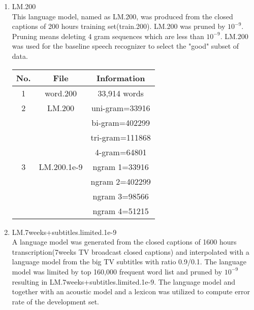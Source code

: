 \begin{enumerate}
\item LM.200 \\
This language model, named as LM.200, was produced from the closed captions of 200 hours training set(train.200). LM.200 was pruned by $10^{-9}$. Pruning means deleting 4 gram sequences which are less than $10^{-9}$.  LM.200 was used for the baseline speech recognizer to select the "good" subset of data.

\begin{center}
\begin{tabular}{ | c | c | c | }
\hline
\textbf{No.} & \textbf{File}  & \textbf{Information} \\ \hline \hline
1 & word.200 & 33,914 words \\  \hline
2 & LM.200 & uni-gram=33916 \\ 
 & & bi-gram=402299 \\ 
& & tri-gram=111868 \\  
& & 4-gram=64801 \\  \hline
3 & LM.200.1e-9 & ngram 1=33916 \\  
 & & ngram 2=402299 \\  
& & ngram 3=98566 \\  
& & ngram 4=51215 \\  \hline
\end{tabular}
\end{center}

\item LM.7weeks+subtitles.limited.1e-9 \\
A language model was generated from the closed captions of 1600 hours transcription(7weeks TV broadcast closed captions) and interpolated with a language model from the big TV subtitles with ratio 0.9/0.1. The language model was limited by top 160,000 frequent word list and pruned by $10^{-9}$ resulting in LM.7weeks+subtitles.limited.1e-9.  The language model and together with an acoustic model and a lexicon was utilized to compute error rate of the development set.


\end{enumerate}
